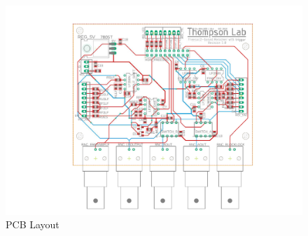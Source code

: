 \documentclass[10pt]{report}
\begin{document}
\begin{figure}[hbt]
	\centering
	\includegraphics[width=.75\textwidth]{includes/relocker_pcb_layout.pdf}
	\caption{PCB Layout}
	\label{fig:pcblayout}
\end{figure}



\end{document}
